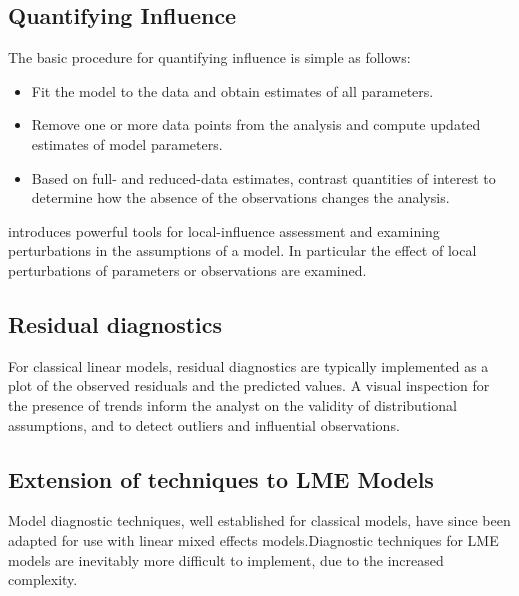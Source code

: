 \documentclass[Main.tex]{subfiles}
\begin{document}
	
	\subsection{Quantifying Influence}  %
	
	The basic procedure for quantifying influence is simple as follows:
	
	\begin{itemize}
		\item Fit the model to the data and obtain estimates of all parameters.
		\item Remove one or more data points from the analysis and compute updated estimates of model parameters.
		\item Based on full- and reduced-data estimates, contrast quantities of interest to determine how the absence of the observations changes the analysis.
	\end{itemize}
	
	\citet{cook86} introduces powerful tools for local-influence assessment and examining perturbations in the assumptions of a model. In particular the effect of local perturbations of parameters or observations are examined.
	
	
	





\newpage
\subsection{Residual diagnostics} %
For classical linear models, residual diagnostics are typically implemented as a plot of the observed residuals and the predicted values. A visual inspection for the presence of trends inform the analyst on the validity of distributional assumptions, and to detect outliers and influential observations.

\newpage
\subsection*{Extension of techniques to LME Models} %

Model diagnostic techniques, well established for classical models, have since been adapted for use with linear mixed effects models.Diagnostic techniques for LME models are inevitably more difficult to implement, due to the increased complexity.
\end{document}

